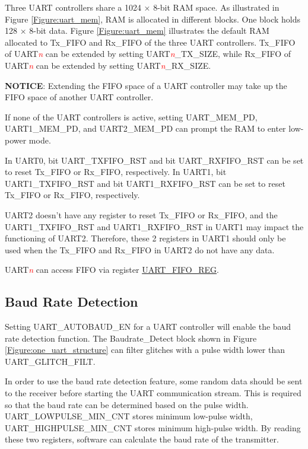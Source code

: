 \documentclass[main\_\_EN.tex]{subfiles}
\begin{document}
Three UART controllers share a 1024 × 8-bit RAM space. As illustrated in Figure \ref{Figure:uart_mem}, RAM is allocated in different blocks. One block holds 128 × 8-bit data. Figure \ref{Figure:uart_mem} illustrates the default RAM allocated to Tx\_FIFO and Rx\_FIFO of the three UART controllers. Tx\_FIFO of UART\textcolor{red}{\it{n}} can be extended by setting UART\textcolor{red}{\it{n}}\_TX\_SIZE, while Rx\_FIFO of UART\textcolor{red}{\it{n}} can be extended by setting UART\textcolor{red}{\it{n}}\_RX\_SIZE.

{\bf NOTICE}: Extending the FIFO space of a UART controller may take up the FIFO space of another UART controller.

If none of the UART controllers is active, setting UART\_MEM\_PD, UART1\_MEM\_PD, and UART2\_MEM\_PD can prompt the RAM to enter low-power mode.

In UART0, bit UART\_TXFIFO\_RST and bit UART\_RXFIFO\_RST can be set to reset Tx\_FIFO or Rx\_FIFO, respectively. In UART1, bit UART1\_TXFIFO\_RST and bit UART1\_RXFIFO\_RST can be set to reset Tx\_FIFO or Rx\_FIFO, respectively.

\begin{tiplisting}
UART2 doesn't have any register to reset Tx\_FIFO or Rx\_FIFO, and the UART1\_TXFIFO\_RST and UART1\_RXFIFO\_RST in UART1 may impact the functioning of UART2. Therefore, these 2 registers in UART1 should only be used when the Tx\_FIFO and Rx\_FIFO in UART2 do not have any data.
\end{tiplisting}

UART\textcolor{red}{\it{n}} can access FIFO via register \hyperref[regdesc:UARTFIFOREG]{UART\_FIFO\_REG}.

\subsection{Baud Rate Detection}

Setting UART\_AUTOBAUD\_EN for a UART controller will enable the baud rate detection function. The Baudrate\_Detect block shown in Figure \ref{Figure:one_uart_structure} can filter glitches with a pulse width lower than UART\_GLITCH\_FILT.

In order to use the baud rate detection feature, some random data should be sent to the receiver before starting the UART communication stream. This is required so that the baud rate can be determined based on the pulse width. UART\_LOWPULSE\_MIN\_CNT stores minimum low-pulse width, UART\_HIGHPULSE\_MIN\_CNT stores minimum high-pulse width. By reading these two registers, software can calculate the baud rate of the transmitter.
\end{document}
